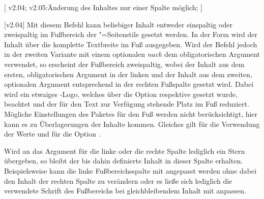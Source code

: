 \begin{DeclareEntity*}{}
\begin{DeclareEntity*}{}
\begin{DeclareEntity*}{}
\begin{Declaration}
  {}
  [
    v2.04;
    v2.05:Änderung des Inhaltes nur einer Spalte möglich;
  ]
\begin{Declaration}
  {}
  [v2.04]
Mit diesem Befehl kann beliebiger Inhalt entweder einspaltig oder zweispaltig 
im Fußbereich der "=Seitenstile gesetzt werden. In der 
Form  wird der Inhalt über die komplette 
Textbreite im Fuß ausgegeben. Wird der Befehl jedoch in der zweiten Variante 
 mit einem 
optionalen \emph{nach} dem obligatorischen Argument verwendet, so erscheint der 
Fußbereich zweispaltig, wobei der Inhalt aus dem ersten, obligatorischen 
Argument in der linken und der Inhalt aus dem zweiten, optionalen Argument 
entsprechend in der rechten Fußspalte gesetzt wird. Dabei wird ein etwaiges 
\DDC-Logo, welches über die Option  respektive  
gesetzt wurde, beachtet und der für den Text zur Verfügung stehende Platz im 
Fuß reduziert. Mögliche Einstellungen des Paketes  
für den Fuß werden nicht berücksichtigt, hier kann es zu Überlagerungen der 
Inhalte kommen. Gleiches gilt für die Verwendung der Werte  und 
 für die Option .

%
Wird an das Argument für die linke oder die rechte Spalte lediglich ein Stern 
\PValue{*} übergeben, so bleibt der bis dahin definierte Inhalt in dieser 
Spalte erhalten. Beispielsweise kann die linke Fußbereichsspalte mit 
 angepasst werden ohne dabei den 
Inhalt der rechten Spalte zu verändern oder es ließe sich lediglich die 
verwendete Schrift des Fußbereichs bei gleichbleibendem Inhalt mit 
 anpassen.


\end{Declaration}
\end{Declaration}
\end{DeclareEntity*}
\end{DeclareEntity*}
\end{DeclareEntity*}
